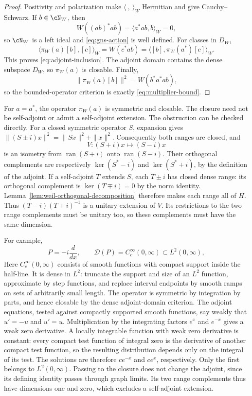 \begin{proof}
Positivity and polarization make $\langle\ ,\ \rangle_W$ Hermitian and
give Cauchy--Schwarz.  If $b\in\cN_W$, then
\[
 W((ab)^*ab)=\langle a^*ab,b\rangle_W=0,
\]
so $\cN_W$ is a left ideal and \eqref{eq:gns-action} is well defined.
For classes in $D_W$,
\[
 \langle\pi_W(a)[b],[c]\rangle_W
 =W(c^*ab)
 =\langle[b],\pi_W(a^*)[c]\rangle_W.
\]
This proves \eqref{eq:adjoint-inclusion}.  The adjoint domain contains
the dense subspace $D_W$, so $\pi_W(a)$ is closable.  Finally,
\[
 \|\pi_W(a)[b]\|^2=W(b^*a^*ab),
\]
so the bounded-operator criterion is exactly
\eqref{eq:multiplier-bound}.
\end{proof}

For $a=a^*$, the operator $\pi_W(a)$ is symmetric and closable.
The closure need not be self-adjoint or admit a self-adjoint extension.
The obstruction can be checked directly.  For a closed symmetric operator
$S$, expansion gives
$\|(S\pm i)x\|^2=\|Sx\|^2+\|x\|^2$.
Consequently both ranges are closed, and
\[
 V:(S+i)x\longmapsto(S-i)x
\]
is an isometry from $\operatorname{ran}(S+i)$ onto
$\operatorname{ran}(S-i)$.  Their orthogonal complements are respectively
$\ker(S^*-i)$ and $\ker(S^*+i)$, by the definition of the adjoint.
If a self-adjoint $T$ extends $S$, each $T\pm i$ has closed dense range:
its orthogonal complement is $\ker(T\mp i)=0$ by the norm identity.
Lemma~\ref{lem:weil-orthogonal-decomposition} therefore makes each range
all of $H$.
Thus $(T-i)(T+i)^{-1}$ is a unitary extension of $V$.
Its restrictions to the two range complements must be unitary too, so
these complements must have the same dimension.

For example,
\[
 P=-i\frac{d}{dx},\qquad \mathcal D(P)=C_c^\infty(0,\infty)
 \subset L^2(0,\infty),
\]
Here $C_c^\infty(0,\infty)$ consists of smooth functions with compact
support inside the half-line.  It is dense in $L^2$: truncate the support
and size of an $L^2$ function, approximate by step functions, and replace interval endpoints
by smooth ramps on sets of arbitrarily small length.  The operator is
symmetric by integration by parts, and hence closable by the dense
adjoint-domain criterion.  The adjoint equations, tested against compactly
supported smooth functions, say weakly that $u'=-u$ and $u'=u$.
Multiplication by the integrating factors $e^x$ and $e^{-x}$ gives a weak
zero derivative.  A locally integrable function with weak zero derivative
is constant: every compact test function of integral zero is the derivative
of another compact test function, so the resulting distribution depends
only on the integral of its test.  The solutions are therefore $ce^{-x}$
and $ce^x$, respectively.  Only the first belongs to $L^2(0,\infty)$.
Passing to the closure does not change the adjoint, since its defining
identity passes through graph limits.  Its two range complements thus
have dimensions one and zero, which excludes a self-adjoint extension.

